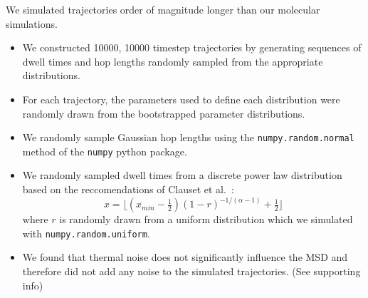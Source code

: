 \documentclass{article}
\begin{document}
  We simulated trajectories order of magnitude longer than our molecular simulations. 
  \begin{itemize}
	\item We constructed 10000, 10000 timestep trajectories by generating
	sequences of dwell times and hop lengths randomly sampled from the appropriate
	distributions.
	\item For each trajectory, the parameters used to define each distribution were
	randomly drawn from the bootstrapped parameter distributions.
	\item We randomly sample Gaussian hop lengths using the
	\texttt{numpy.random.normal} method of the \texttt{numpy} python package.
	\item We randomly sampled dwell times from a discrete power law
	distribution based on the reccomendations of Clauset et
	al.~\cite{clauset_power-law_2009}: 
	\begin{equation}
	x = \lfloor
	(x_{min} - \tfrac{1}{2})(1 - r)^{-1/(\alpha - 1)} + \tfrac{1}{2} \rfloor
	\label{eqn:discrete_powerlaw_draws}
	\end{equation}
	where $r$ is randomly drawn from a uniform distribution which we simulated
	with \texttt{numpy.random.uniform}.
	\item We found that thermal noise does not significantly influence the MSD and
	therefore did not add any noise to the simulated trajectories. (See supporting info)
  \end{itemize}
\end{document}
